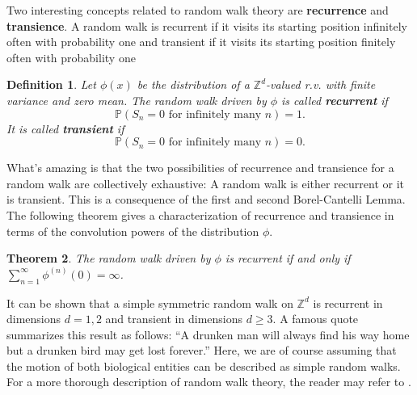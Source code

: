 \documentclass[11pt, letter]{book}
\newtheorem{theorem}{Theorem}[section]
\newtheorem{definition}[theorem]{Definition}
\begin{document}
\noindent Two interesting concepts related to random walk theory are \textbf{recurrence} and \textbf{transience}. A random walk is recurrent
if it visits its starting position infinitely often with probability one and transient if it visits its starting position finitely often with probability one

\begin{framed}
\begin{definition}
Let $\phi(x)$ be the distribution of a  $\mathbb{Z}^d$-valued r.v. with finite variance and zero mean. The random walk driven by $\phi$ is called \textbf{recurrent} if
\begin{equation*}
    \mathbb{P}(S_n = 0 \text{ for infinitely many } n ) = 1.
\end{equation*}
It is called \textbf{transient} if
\begin{equation*}
    \mathbb{P}(S_n = 0 \text{ for infinitely many } n ) = 0.
\end{equation*}
\end{definition}
\end{framed}
\noindent What's amazing is that the two possibilities of recurrence and transience for a random walk are collectively exhaustive: A random walk is either recurrent or it is transient. This is a consequence of the first and second Borel-Cantelli Lemma. The following theorem gives a characterization of recurrence and transience in terms of the convolution powers of the distribution $\phi$.

\begin{framed}
\begin{theorem}
The random walk driven by $\phi$ is recurrent if and only if $\sum_{n=1}^\infty \phi^{(n)}(0) = \infty$.
\end{theorem}
\end{framed}



\noindent It can be shown that a simple symmetric random walk on $\mathbb{Z}^d$ is recurrent in dimensions $d = 1, 2$ and transient in dimensions $d \geq 3$. A famous quote summarizes this result as follows: ``A drunken man will
always find his way home but a drunken bird may get lost forever.'' Here, we are of course assuming that the motion of both biological entities can be described as simple random walks. For a more thorough description of random walk theory, the reader may refer to \cite{spitzer_principles_1964}.\\
\end{document}
